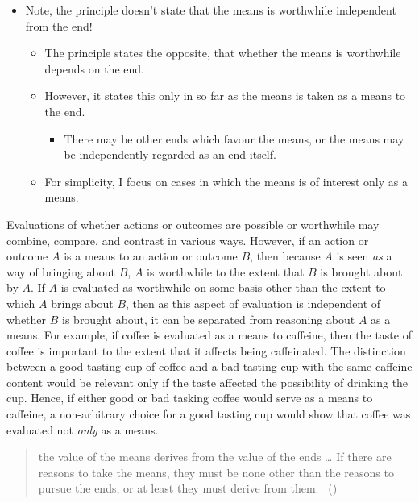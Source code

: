 \documentclass[10pt]{article}
\newcommand{\hozlinedash}[0]{%
  \noindent\hdashrule[0.5ex][c]{\textwidth}{.1pt}{2.5pt}
}
\begin{document}
\begin{itemize}
\item Note, the principle doesn't state that the means is worthwhile independent from the end!
  \begin{itemize}
  \item The principle states the opposite, that whether the means is worthwhile depends on the end.
  \item However, it states this only in so far as the means is taken as a means to the end.
    \begin{itemize}
    \item There may be other ends which favour the means, or the means may be independently regarded as an end itself.
    \end{itemize}
  \item For simplicity, I focus on cases in which the means is of interest only as a means.
  \end{itemize}
\end{itemize}


\hozlinedash

Evaluations of whether actions or outcomes are possible or worthwhile may combine, compare, and contrast in various ways.
However, if an action or outcome \(A\) is a means to an action or outcome \(B\), then because \(A\) is seen \emph{as} a way of bringing about \(B\), \(A\) is worthwhile to the extent that \(B\) is brought about by \(A\).
If \(A\) is evaluated as worthwhile on some basis other than the extent to which \(A\) brings about \(B\), then as this aspect of evaluation is independent of whether \(B\) is brought about, it can be separated from reasoning about \(A\) as a means.
For example, if coffee is evaluated as a means to caffeine, then the taste of coffee is important to the extent that it affects being caffeinated.
The distinction between a good tasting cup of coffee and a bad tasting cup with the same caffeine content would be relevant only if the taste affected the possibility of drinking the cup.
Hence, if either good or bad tasking coffee would serve as a means to caffeine, a non-arbitrary choice for a good tasting cup would show that coffee was evaluated not \emph{only} as a means.

\newpage

\hozlinedash

\begin{quote}
    the value of the means derives from the value of the ends \dots
    If there are reasons to take the means, they must be none other than the reasons to pursue the ends, or at least they must derive from them.\nolinebreak
  \mbox{ }\hfill\mbox{(\cite[2]{Raz:2005aa})}
\end{quote}
\end{document}
